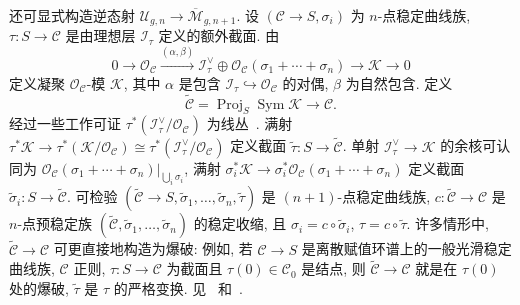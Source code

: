 \begin{remark}\label{src:6.6.13}
还可显式构造逆态射 $\mathcal U_{g,\allowbreak n}\to\overline{\mathcal M}_{g,\allowbreak n+1}$. 设 $(\mathcal C\to\allowbreak S,\allowbreak \sigma_i)$ 为 $n$-点稳定曲线族, $\tau:S\to\mathcal C$ 是由理想层 $\mathcal I_\tau$ 定义的额外截面. 由
\[
0\to\mathcal O_{\mathcal C}\xrightarrow{(\alpha,\beta)}\mathcal I_\tau^\vee\oplus\mathcal O_{\mathcal C}(\sigma_1+\cdots+\sigma_n)\to\mathcal K\to0
\]
定义凝聚 $\mathcal O_{\mathcal C}$-模 $\mathcal K$, 其中 $\alpha$ 是包含 $\mathcal I_\tau\hookrightarrow\mathcal O_{\mathcal C}$ 的对偶, $\beta$ 为自然包含. 定义
\[
\widetilde{\mathcal C}=\operatorname{Proj}_S\operatorname{Sym}\mathcal K\to\mathcal C.
\]
经过一些工作可证 $\tau^*(\mathcal I_\tau^\vee/\mathcal O_{\mathcal C})$ 为线丛~\cite[引理 2.2]{Knu83a}. 满射 $\tau^*\mathcal K\to\tau^*(\mathcal K/\mathcal O_{\mathcal C})\cong\tau^*(\mathcal I_\tau^\vee/\mathcal O_{\mathcal C})$ 定义截面 $\widetilde\tau:S\to\widetilde{\mathcal C}$. 单射 $\mathcal I_\tau^\vee\to\mathcal K$ 的余核可认同为 $\mathcal O_{\mathcal C}(\sigma_1+\cdots+\sigma_n)|_{\bigcup_i\sigma_i}$, 满射 $\sigma_i^*\mathcal K\to\sigma_i^*\mathcal O_{\mathcal C}(\sigma_1+\cdots+\sigma_n)$ 定义截面 $\widetilde\sigma_i:S\to\widetilde{\mathcal C}$. 可检验 $(\widetilde{\mathcal C}\to\allowbreak S,\allowbreak \widetilde\sigma_1,\allowbreak \ldots,\allowbreak \widetilde\sigma_n,\allowbreak \widetilde\tau)$ 是 $(n+1)$-点稳定曲线族, $c:\widetilde{\mathcal C}\to\mathcal C$ 是 $n$-点预稳定族 $(\widetilde{\mathcal C},\allowbreak \widetilde\sigma_1,\allowbreak \ldots,\allowbreak \widetilde\sigma_n)$ 的稳定收缩, 且 $\sigma_i=c\circ\widetilde\sigma_i$, $\tau=c\circ\widetilde\tau$. 许多情形中, $\widetilde{\mathcal C}\to\mathcal C$ 可更直接地构造为爆破: 例如, 若 $\mathcal C\to\allowbreak S$ 是离散赋值环谱上的一般光滑稳定曲线族, $\mathcal C$ 正则, $\tau:S\to\mathcal C$ 为截面且 $\tau(0)\in\mathcal C_0$ 是结点, 则 $\widetilde{\mathcal C}\to\mathcal C$ 就是在 $\tau(0)$ 处的爆破, $\widetilde\tau$ 是 $\tau$ 的严格变换. 见~\cite[定理 2.4]{Knu83a} 和~\cite[\S X.8]{ACG11}.
\end{remark}
